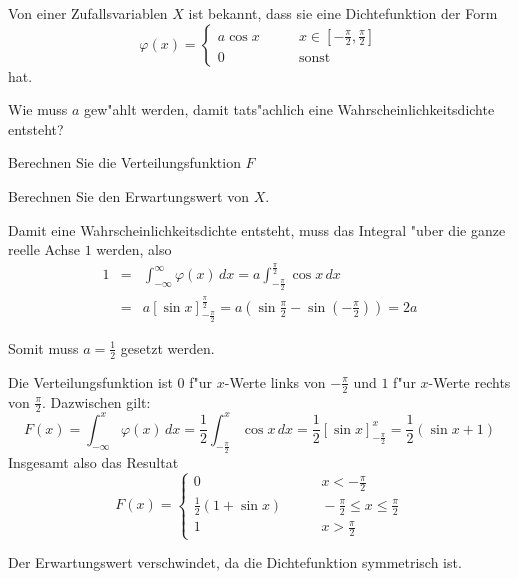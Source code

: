 Von einer Zufallsvariablen $X$ ist bekannt, dass sie eine Dichtefunktion
der Form
\[
\varphi(x)=\begin{cases}
a\cos x&\qquad x\in[-\frac{\pi}2,\frac{\pi}2]\\
0&\qquad\text{sonst}
\end{cases}
\]
hat.
\begin{teilaufgaben}
\item Wie muss $a$ gew"ahlt werden, damit tats"achlich eine
Wahrscheinlichkeitsdichte entsteht?
\item Berechnen Sie die Verteilungsfunktion $F$
\item Berechnen Sie den Erwartungswert von $X$.
\end{teilaufgaben}

\begin{loesung}
\begin{teilaufgaben}
\item Damit eine Wahrscheinlichkeitsdichte entsteht, muss das Integral
"uber die ganze reelle Achse $1$ werden, also
\begin{eqnarray*}
1&=&\int_{-\infty}^\infty\varphi(x)\,dx
=a\int_{-\frac{\pi}2}^{\frac{\pi}2}\cos x\,dx\\
&=&a\left[\sin x\right]_{-\frac{\pi}2}^{\frac{\pi}2}
=a\left(\sin\frac{\pi}2 -\sin\left(-\frac{\pi}2\right)\right)
=2a
\end{eqnarray*}

Somit muss $a=\frac12$ gesetzt werden.
\item Die Verteilungsfunktion ist $0$ f"ur $x$-Werte links von $-\frac{\pi}2$
und $1$ f"ur $x$-Werte rechts von $\frac{\pi}2$. Dazwischen gilt:
\[
F(x)=\int_{-\infty}^x\varphi(x)\,dx
=\frac12\int_{-\frac{\pi}2}^x\cos x\,dx
=\frac12\left[\sin x\right]_{-\frac{\pi}2}^x
=\frac12(\sin x + 1)
\]
Insgesamt also das Resultat
\[
F(x)=\begin{cases}
0&\qquad x<-\frac{\pi}2\\
\frac12(1+\sin x)&\qquad -\frac{\pi}2\le x\le\frac{\pi}2\\
1&\qquad x>\frac{\pi}2
\end{cases}
\]
\item Der Erwartungswert verschwindet, da die Dichtefunktion symmetrisch ist.
\qedhere
\end{teilaufgaben}
\end{loesung}

